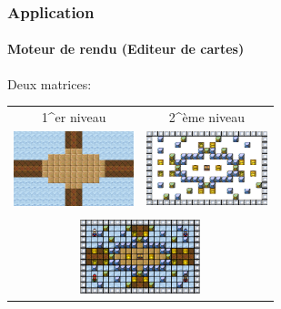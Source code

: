 	\begin{frame}
		\frametitle{Application}
		\framesubtitle{Moteur de rendu (Editeur de cartes)}		
		
		Deux matrices:
		\begin{center}
			\begin{tabular}{cc}
				1^{er} niveau & 2^{ème} niveau \\
				\includegraphics[width=3.5cm]{./img/img10.png} & \includegraphics[width=3.5cm]{./img/img12.png} \\
				\multicolumn{2}{c}{\Downarrow} \\
				\multicolumn{2}{c}{\includegraphics[width=3.5cm]{./img/img9.png}} 
			\end{tabular}
		\end{center}
	\end{frame}
	
	
%		
	
